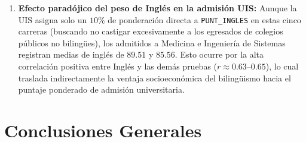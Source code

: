 \documentclass[11pt,letterpaper]{article}
\begin{document}
\begin{enumerate}
    \item \textbf{Efecto paradójico del peso de Inglés en la admisión UIS:} Aunque la UIS asigna solo un $10\%$ de ponderación directa a \texttt{PUNT\_INGLES} en estas cinco carreras (buscando no castigar excesivamente a los egresados de colegios públicos no bilingües), los admitidos a Medicina e Ingeniería de Sistemas registran medias de inglés de \textbf{$89.51$} y \textbf{$85.56$}. Esto ocurre por la alta correlación positiva entre Inglés y las demás pruebas ($r \approx 0.63$–$0.65$), lo cual traslada indirectamente la ventaja socioeconómica del bilingüismo hacia el puntaje ponderado de admisión universitaria.
\end{enumerate}

\section{Conclusiones Generales}
\end{document}
